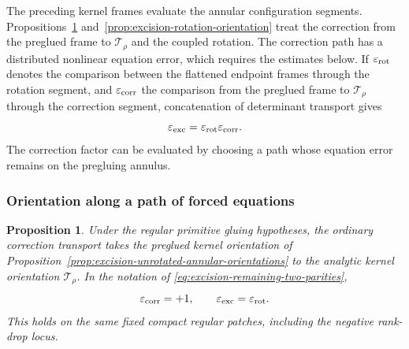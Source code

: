 \documentclass[11pt]{amsart}
\newtheorem{proposition}[theorem]{Proposition}
\theoremstyle{definition}
\theoremstyle{remark}
\theoremstyle{plain}
\begin{document}
The preceding kernel frames evaluate the annular configuration
segments. Propositions~\ref{prop:excision-correction-orientation}
and~\ref{prop:excision-rotation-orientation} treat the correction
from the preglued frame to $\mathcal T_\rho$ and the coupled
rotation. The correction path has a distributed nonlinear
equation error, which requires the estimates below.
If $\varepsilon_{\rm rot}$ denotes the comparison between the
flattened endpoint frames through the rotation segment, and
$\varepsilon_{\rm corr}$ the comparison from the preglued frame
to $\mathcal T_\rho$ through the correction segment, concatenation
of determinant transport gives
\begin{equation}\label{eq:excision-remaining-two-parities}
             \varepsilon_{\rm exc}
                  =\varepsilon_{\rm rot}\varepsilon_{\rm corr}.
\end{equation}
The correction factor can be evaluated by choosing a path whose
equation error remains on the pregluing annulus.

\subsubsection{Orientation along a path of forced equations}

\begin{proposition}\label{prop:excision-correction-orientation}
Under the regular primitive gluing hypotheses, the ordinary
correction transport takes the preglued kernel orientation of
Proposition~\ref{prop:excision-unrotated-annular-orientations}
to the analytic kernel orientation $\mathcal T_\rho$.
In the notation of \eqref{eq:excision-remaining-two-parities},
\begin{equation}\label{eq:excision-correction-sign}
              \varepsilon_{\rm corr}=+1,\qquad
              \varepsilon_{\rm exc}=\varepsilon_{\rm rot}.
\end{equation}
This holds on the same fixed compact regular patches, including
the negative rank-drop locus.
\end{proposition}
\end{document}
